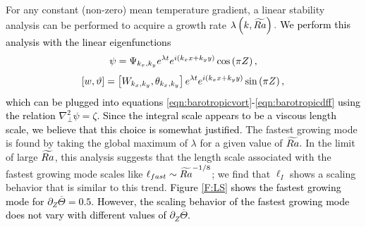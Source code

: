 For any constant (non-zero) mean temperature gradient, a linear stability analysis can be performed to acquire a growth rate $\lambda\left ( k,\widetilde{Ra}\right ). $ 
\textcolor{black}{We perform this analysis with the linear eigenfunctions
	\[\psi = \Psi_{k_x,k_y}e^{\lambda t}e^{i\left ( k_x x + k_y y\right ) }\cos \left ( \pi Z\right ), \]
\[\left[ w,\vartheta \right] = \left[ W_{k_x,k_y}, \theta_{k_{x},k_{y}}\right] e^{\lambda t}e^{i\left ( k_x x + k_y y\right ) }\sin \left ( \pi Z\right ), \]
which can be plugged into equations \eqref{eqn:barotropicvort}-\eqref{eqn:barotropicdff} using the relation $\nabla_{\perp}^{2}\psi = \zeta.$ Since the integral scale appears to be a viscous length scale, we believe that this choice is somewhat justified. }
The fastest growing mode is found by taking the global maximum of $\lambda$ for a given value of $\widetilde{Ra}.$
In the limit of large $\widetilde{Ra}$, this analysis suggests that the length scale associated with the fastest growing mode scales like $\ell_{fast}\sim \widetilde{Ra}^{-1/8}$; we find that $\ell_I$ shows a scaling behavior that is similar to this trend. \textcolor{black}{Figure \ref{F:LS} shows the fastest growing mode for $\partial_{Z}\overline\Theta = 0.5$. However, the scaling behavior of the fastest growing mode does not vary with different values of $\partial_{Z}\overline\Theta.$}




